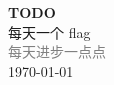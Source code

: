 \vspace*{\fill}
\begin{center}
    \textcolor{green!50}{\Huge\textbf{TODO}} \\[1em]
    \textcolor{green!60!pink}{\Large 每天一个 flag} \\[2em]
    \textcolor{gray}{\large 每天进步一点点} \\[1em]
    \today
\end{center}
\vspace*{\fill}
\clearpage


\clearpage

\clearpage
